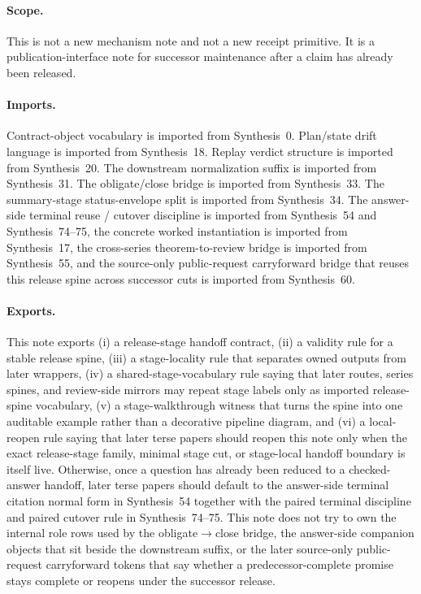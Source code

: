 \documentclass[11pt]{article}
\begin{document}
\paragraph{Scope.}
This is not a new mechanism note and not a new receipt primitive.
It is a publication-interface note for successor maintenance after a claim has already been released.

\paragraph{Imports.}
Contract-object vocabulary is imported from Synthesis~0.\cite{series:contractobjects}
Plan/state drift language is imported from Synthesis~18.\cite{series:planstateequiv}
Replay verdict structure is imported from Synthesis~20.\cite{series:auditorreplay}
The downstream normalization suffix is imported from Synthesis~31.\cite{series:downstreamnormalforms}
The obligate/close bridge is imported from Synthesis~33.\cite{series:releaseclosure}
The summary-stage status-envelope split is imported from Synthesis~34.\cite{series:statusenvelopes}
The answer-side terminal reuse / cutover discipline is imported from Synthesis~54 and Synthesis~74--75, the concrete worked instantiation is imported from Synthesis~17, the cross-series theorem-to-review bridge is imported from Synthesis~55, and the source-only public-request carryforward bridge that reuses this release spine across successor cuts is imported from Synthesis~60.\cite{series:challengeanswerreviewmenus,series:pairedterminalcitationdiscipline,series:pairedterminalcutoverrules,series:workedexample,series:seriesspines,series:publicrequestcarryforward}

\paragraph{Exports.}
This note exports (i) a release-stage handoff contract, (ii) a validity rule for a stable release spine, (iii) a stage-locality rule that separates owned outputs from later wrappers, (iv) a shared-stage-vocabulary rule saying that later routes, series spines, and review-side mirrors may repeat stage labels only as imported release-spine vocabulary, (v) a stage-walkthrough witness that turns the spine into one auditable example rather than a decorative pipeline diagram, and (vi) a local-reopen rule saying that later terse papers should reopen this note only when the exact release-stage family, minimal stage cut, or stage-local handoff boundary is itself live. Otherwise, once a question has already been reduced to a checked-answer handoff, later terse papers should default to the answer-side terminal citation normal form in Synthesis~54 together with the paired terminal discipline and paired cutover rule in Synthesis~74--75. This note does not try to own the internal role rows used by the obligate$\to$close bridge, the answer-side companion objects that sit beside the downstream suffix, or the later source-only public-request carryforward tokens that say whether a predecessor-complete promise stays complete or reopens under the successor release.\cite{series:challengeanswerreviewmenus,series:pairedterminalcitationdiscipline,series:pairedterminalcutoverrules}
\end{document}
